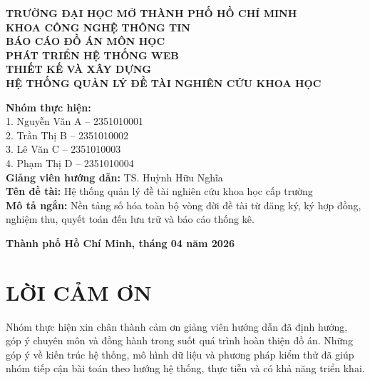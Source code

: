 \documentclass[12pt,a4paper]{report}
\begin{document}
\begin{titlepage}
\begin{center}
\textbf{\Large TRƯỜNG ĐẠI HỌC MỞ THÀNH PHỐ HỒ CHÍ MINH}\\[0.3cm]
\textbf{\large KHOA CÔNG NGHỆ THÔNG TIN}\\[1.5cm]

\textbf{\Large BÁO CÁO ĐỒ ÁN MÔN HỌC}\\[0.4cm]
\textbf{\large PHÁT TRIỂN HỆ THỐNG WEB}\\[1.5cm]

\textbf{\LARGE THIẾT KẾ VÀ XÂY DỰNG}\\[0.2cm]
\textbf{\LARGE HỆ THỐNG QUẢN LÝ ĐỀ TÀI NGHIÊN CỨU KHOA HỌC}\\[1.8cm]

\begin{flushleft}
\textbf{Nhóm thực hiện:}\\
1. Nguyễn Văn A -- 2351010001\\
2. Trần Thị B -- 2351010002\\
3. Lê Văn C -- 2351010003\\
4. Phạm Thị D -- 2351010004\\[0.6cm]

\textbf{Giảng viên hướng dẫn:} TS. Huỳnh Hữu Nghĩa\\
\textbf{Tên đề tài:} Hệ thống quản lý đề tài nghiên cứu khoa học cấp trường\\
\textbf{Mô tả ngắn:} Nền tảng số hóa toàn bộ vòng đời đề tài từ đăng ký, ký hợp đồng, nghiệm thu, quyết toán đến lưu trữ và báo cáo thống kê.
\end{flushleft}

\vfill
\textbf{Thành phố Hồ Chí Minh, tháng 04 năm 2026}
\end{center}
\end{titlepage}

\chapter*{LỜI CẢM ƠN}
Nhóm thực hiện xin chân thành cảm ơn giảng viên hướng dẫn đã định hướng, góp ý chuyên môn và đồng hành trong suốt quá trình hoàn thiện đồ án. Những góp ý về kiến trúc hệ thống, mô hình dữ liệu và phương pháp kiểm thử đã giúp nhóm tiếp cận bài toán theo hướng hệ thống, thực tiễn và có khả năng triển khai.
\end{document}
